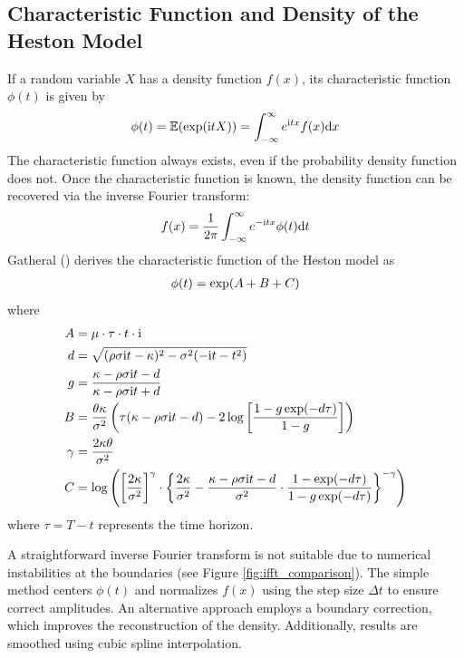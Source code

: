 \subsection{Characteristic Function and Density of the Heston Model}

If a random variable $X$ has a density function $f(x)$, its characteristic function $\phi(t)$ is given by
\begin{align}
    \phi(t) = \mathbb{E}(\exp(\mathrm{i}tX)) = \int_{-\infty}^{\infty} e^{\mathrm{i}tx}f(x)\mathrm{d}x \notag
\end{align}
The characteristic function always exists, even if the probability density function does not. Once the characteristic function is known, the density function can be recovered via the inverse Fourier transform:
\begin{align}
    f(x) = \frac{1}{2\pi}\int_{-\infty}^{\infty} e^{-\mathrm{i}tx}\phi(t)\mathrm{d}t \notag
\end{align}
Gatheral (\citeyear{gatheralVolatilitySurfacePractitioner2011}) derives the characteristic function of the Heston model as
\begin{align}
    \phi(t) = \exp(A + B + C) \notag
\end{align}
where
\begin{align}
    A &= \mu\cdot\tau\cdot t\cdot\mathrm{i} \notag \\
    d &= \sqrt{(\rho\sigma\mathrm{i}t - \kappa)^2 - \sigma^2(-\mathrm{i}t - t^2)} \notag \\
    g &= \frac{\kappa - \rho\sigma\mathrm{i}t - d}{\kappa - \rho\sigma\mathrm{i}t + d} \notag \\
    B &= \frac{\theta\kappa}{\sigma^2}\left(\tau(\kappa - \rho\sigma\mathrm{i}t - d) - 2\log\left[\frac{1-g\exp(-d\tau)}{1-g}\right]\right) \notag \\
    \gamma &= \frac{2\kappa\theta}{\sigma^2} \notag \\
    \label{eq:heston_model_characteristic_function_C}
    C &= \log\left(\left[\frac{2\kappa}{\sigma^2}\right]^{\gamma}\cdot \left\lbrace \frac{2\kappa}{\sigma^2} - \frac{\kappa - \rho\sigma\mathrm{i}t - d}{\sigma^2}\cdot\frac{1 - \exp(-d\tau)}{1-g\exp(-d\tau)} \right\rbrace^{-\gamma}\right)
\end{align}
where $\tau = T-t$ represents the time horizon.

A straightforward inverse Fourier transform is not suitable due to numerical instabilities at the boundaries (see Figure \ref{fig:ifft_comparison}). The simple method centers $\phi(t)$ and normalizes $f(x)$ using the step size $\Delta t$ to ensure correct amplitudes. An alternative approach employs a boundary correction, which improves the reconstruction of the density. Additionally, results are smoothed using cubic spline interpolation.

